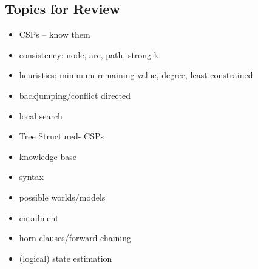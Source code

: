 \subsection*{Topics for Review}
\begin{itemize}
\item CSPs -- know them
\item consistency: node, arc, path, strong-k
\item heuristics: minimum remaining value, degree, least constrained
\item backjumping/conflict directed
\item local search
\item Tree Structured- CSPs
\item knowledge base
\item syntax
\item possible worlds/models
\item entailment
\item horn clauses/forward chaining
\item (logical) state estimation
\end{itemize}
